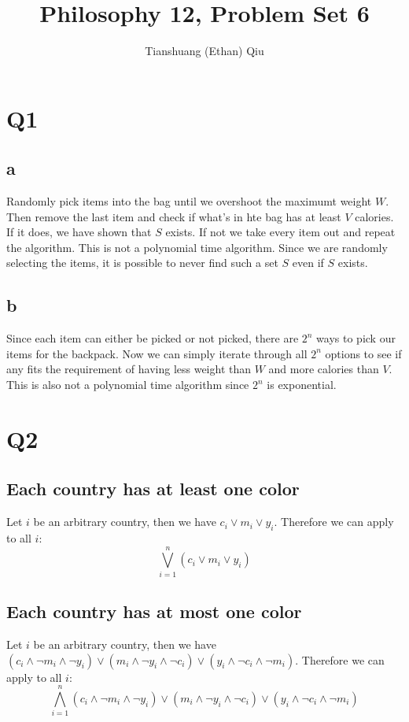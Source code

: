 \documentclass[12pt]{article}
\author{Tianshuang (Ethan) Qiu}
\begin{document}
\title{Philosophy 12, Problem Set 6}
\maketitle

\section{Q1}
\subsection{a}
Randomly pick items into the bag until we overshoot the maximumt weight $W$. Then 
remove the last item and check if what's in hte bag has at least $V$ calories. If 
it does, we have shown that $S$ exists. If not we take every item out and repeat 
the algorithm.
\newline
This is not a polynomial time algorithm. Since we are randomly selecting the items, 
it is possible to never find such a set $S$ even if $S$ exists.

\subsection{b}
Since each item can either be picked or not picked, there are $2^n$ ways to pick 
our items for the backpack. Now we can simply iterate through all $2^n$ options to 
see if any fits the requirement of having less weight than $W$ and more calories than 
$V$.
\newline
This is also not a polynomial time algorithm since $2^n$ is exponential.


\section{Q2}
\subsection{Each country has at least one color}
Let $i$ be an arbitrary country, then we have $c_i \lor m_i \lor y_i$. Therefore we can apply 
to all $i$:
\[\bigvee _{i = 1} ^n (c_i \lor m_i \lor y_i)\]

\subsection{Each country has at most one color}
Let $i$ be an arbitrary country, then we have $(c_i \land \neg m_i \land \neg y_i) \lor
(m_i \land \neg y_i \land \neg c_i) \lor (y_i \land \neg c_i \land \neg m_i)$. 
Therefore we can apply 
to all $i$:
\[\bigwedge _{i = 1} ^n (c_i \land \neg m_i \land \neg y_i) \lor
(m_i \land \neg y_i \land \neg c_i) \lor (y_i \land \neg c_i \land \neg m_i)\]
\end{document}
